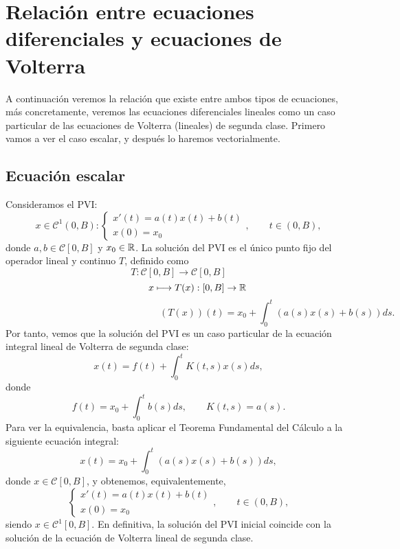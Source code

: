 \chapter{Relación entre ecuaciones diferenciales y ecuaciones de Volterra}
A continuación veremos la relación que existe entre ambos tipos de ecuaciones, más concretamente, veremos las ecuaciones diferenciales lineales como un caso particular de las ecuaciones de Volterra (lineales) de segunda clase. Primero vamos a ver el caso escalar, y después lo haremos vectorialmente.
\section{Ecuación escalar}
Consideramos el PVI:
\begin{equation}
	x \in \mathcal{C}^1(0,B):\left\lbrace\begin{array}{c} x'(t) = a(t)x(t)+b(t) \\ x(0) = x_0 \end{array}\right.,\qquad t \in (0,B),
\end{equation}
donde $a,b \in \mathcal{C}[0,B]$ y $x_0 \in \mathbb{R}$.
La solución del PVI es el único punto fijo del operador lineal y continuo $T$, definido como
\begin{equation}
	T: \mathcal{C}[0,B] \longrightarrow \mathcal{C}[0,B]
\end{equation}
\begin{equation}
	\qquad \qquad x \longmapsto T(x): [0,B] \rightarrow \mathbb{R}
\end{equation}
\begin{equation}
	\qquad \qquad \qquad \qquad \qquad \qquad \qquad \qquad (T(x))(t) = x_0 + \int_0^t(a(s)x(s)+b(s))ds.
\end{equation}
Por tanto, vemos que la solución del PVI es un caso particular de la ecuación integral lineal de Volterra de segunda clase:
\begin{equation}
	x(t) = f(t) + \int_0^t K(t,s)x(s)ds,
\end{equation}
donde
\begin{equation}
	f(t) = x_0 + \int_0^t b(s)ds, \qquad K(t,s) = a(s).
\end{equation}
Para ver la equivalencia, basta aplicar el Teorema Fundamental del Cálculo a la siguiente ecuación integral:
\begin{equation}
	x(t) = x_0 + \int_0^t (a(s)x(s)+b(s))ds,
\end{equation}
donde $x \in \mathcal{C}[0,B]$, y obtenemos, equivalentemente,
\begin{equation}
	\left\lbrace\begin{array}{c} x'(t) = a(t)x(t)+b(t) \\ x(0) = x_0 \end{array}\right.,\qquad t \in (0,B),
\end{equation}
siendo $x \in \mathcal{C}^1[0,B]$. En definitiva, la solución del PVI inicial coincide con la solución de la ecuación de Volterra lineal de segunda clase.
